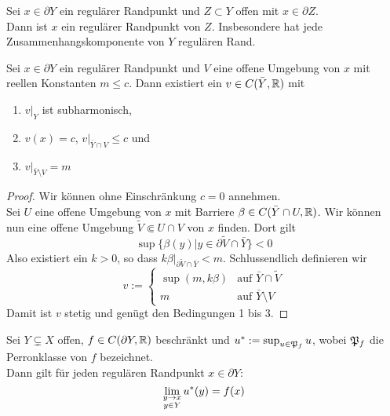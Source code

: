 \begin{cor}
  Sei $x \in \partial Y$ ein regulärer Randpunkt und $Z \subset Y$
  offen mit $x \in \partial Z$.\\
  Dann ist $x$ ein regulärer Randpunkt von $Z$. Insbesondere hat jede
  Zusammenhangskomponente von $Y$ regulären Rand.
\end{cor}

\begin{lemma}
  \label{lemma:regulär-trennen}
  Sei $x \in \partial Y$ ein regulärer Randpunkt und $V$ eine offene
  Umgebung von $x$ mit reellen Konstanten $m \leq c$. Dann existiert
  ein $v \in C( \bar Y, \mathbb{R})$ mit
  \begin{enumerate}
  \item $v|_Y$ ist subharmonisch,
  \item $v(x) = c$, $v|_{\bar Y \cap V} \leq c$ und
  \item $v|_{\bar Y\setminus V} = m$
  \end{enumerate}
\end{lemma}

\begin{proof}
  Wir können ohne Einschränkung $c = 0$ annehmen. \\
  Sei $U$ eine offene Umgebung von $x$ mit Barriere $\beta \in C(\bar
  Y \cap U, \mathbb{R})$. Wir können nun eine offene Umgebung $\tilde V \Subset U \cap V$
  von $x$ finden. Dort gilt
  \[
  \sup\{\beta(y)| y \in \partial \tilde V \cap \bar Y \} < 0
  \]
  Also existiert ein $k > 0$, so dass $k\beta|_{\partial \tilde V \cap
    \bar Y} < m$.
  Schlussendlich definieren wir
  \[
  v :=
  \begin{cases}
    \sup(m, k\beta) & \text{auf } \bar Y \cap \tilde V\\
    m & \text{auf } \bar Y \setminus V
  \end{cases}
  \]
  Damit ist $v$ stetig und genügt den Bedingungen 1 bis 3.
\end{proof}

\begin{lemma}
  Sei $Y \subsetneq X$ offen, $f \in C(\partial Y, \mathbb{R})$ beschränkt und
  $u^\ast := \sup_{u \in \mathfrak{P}_f}u$, wobei $\mathfrak{P}_f$ die Perronklasse von
  $f$ bezeichnet. \\
  Dann gilt für jeden regulären Randpunkt $x \in \partial Y$:
  \[
  \lim_{\substack{y \rightarrow x\\y \in Y}} u^\ast(y) = f(x)
  \]
\end{lemma}

